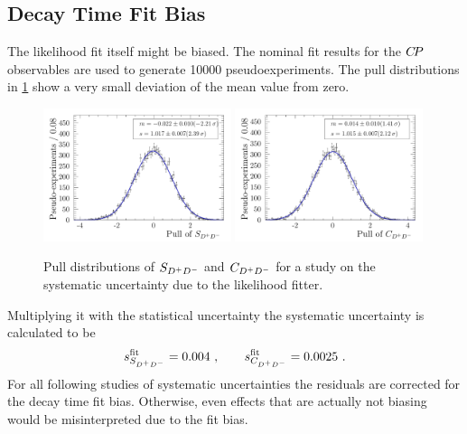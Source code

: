 \FloatBarrier

\subsection{Decay Time Fit Bias}
\label{sec:b02dd:systematics:fitbias}

The likelihood fit itself might be biased. The nominal fit results for the
${C\!P}$ observables are used to generate \num{10000} pseudoexperiments. The pull
distributions in \cref{fig:b02dd:systematics:fitbias:pulls} show a very small
deviation of the mean value from zero.
%
\begin{figure}[htb]
\includegraphics[width=0.49\textwidth]{07-B02DD/tikz/pdf/parSigTimeSin2b_pull_fitbias.pdf}
\includegraphics[width=0.49\textwidth]{07-B02DD/tikz/pdf/parSigTimeC_pull_fitbias.pdf}
\caption{Pull distributions of $S_{{{D}^+}{{D}^-}}$ and $C_{{{D}^+}{{D}^-}}$ for a study on the systematic
uncertainty due to the likelihood fitter.}
\label{fig:b02dd:systematics:fitbias:pulls}
\end{figure}
%
Multiplying it with the statistical uncertainty the systematic uncertainty is
calculated to be
\begin{align}
s_{S_{{{D}^+}{{D}^-}}}^{\textrm{fit}} = \num{0.004}\ , \qquad s_{C_{{{D}^+}{{D}^-}}}^{\textrm{fit}} = \num{0.0025}\ .
\end{align}
For all following studies of systematic uncertainties the residuals are
corrected for the decay time fit bias. Otherwise, even effects that are
actually not biasing would be misinterpreted due to the fit bias.

